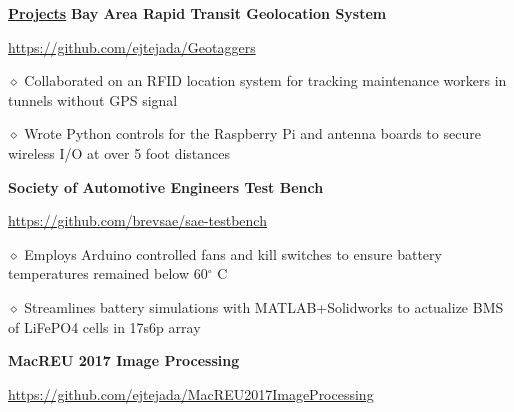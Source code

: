 \documentclass [11pt]{article}
\begin{document}
\begin{flushleft}
\underline{\textbf{Projects}}
\linebreak
\textbf{Bay Area Rapid Transit Geolocation System}\begin{minipage}{0.61 \linewidth}\begin{flushright}\href{https://github.com/ejtejada/Geotaggers}{https://github.com/ejtejada/Geotaggers}\end{flushright}\end{minipage}

‭‭\quad\quad\quad$\diamond$ Collaborated on an RFID location system for tracking maintenance workers in tunnels without GPS signal

‭‭\quad\quad\quad$\diamond$ Wrote Python controls for the Raspberry Pi and antenna boards to secure wireless I/O at over 5 foot distances
%
‭‭%
%
‭‭%

\textbf{Society of Automotive Engineers Test Bench}\begin{minipage}{0.62 \linewidth}\begin{flushright}\href{https://github.com/brevsae/sae-testbench}{https://github.com/brevsae/sae-testbench}\end{flushright}\end{minipage}

\quad\quad\quad$\diamond$ Employs Arduino controlled fans and kill switches to ensure battery temperatures remained below 60$^{\circ}$ C

‭‭\quad\quad\quad$\diamond$ Streamlines battery simulations with MATLAB+Solidworks to actualize BMS of LiFePO4 cells in 17s6p array

\textbf{MacREU 2017 Image Processing}\begin{minipage}{0.71 \linewidth}\begin{flushright}\href{https://github.com/ejtejada/MacREU2017ImageProcessing}{https://github.com/ejtejada/MacREU2017ImageProcessing}\end{flushright}\end{minipage}


\end{flushleft}
\end{document}
